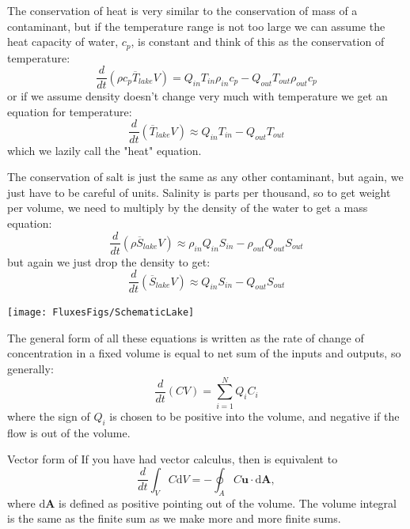 The conservation of heat is very similar to the conservation of mass of a contaminant, but if the temperature range is not too large we can assume the heat capacity of water, $c_p$, is constant and think of this as the conservation of temperature:
\begin{equation}
    \frac{d}{dt}\left(\rho c_p \overline{T}_{lake} V\right) = Q_{in} T_{in}\rho_{in} c_p - Q_{out}T_{out} \rho_{out} c_p
\end{equation}
or if we assume density doesn't change very much with temperature we get an equation for temperature:
\begin{equation}
    \frac{d}{dt}\left(\overline{T}_{lake} V\right) \approx Q_{in} T_{in} - Q_{out}T_{out} 
\end{equation}
which we lazily call the "heat" equation.  

The conservation of salt is just the same as any other contaminant, but again, we just have to be careful of units.  Salinity is parts per thousand, so to get weight per volume, we need to multiply by the density of the water to get a mass equation:
\begin{equation}
    \frac{d}{dt}\left(\rho \overline{S}_{lake} V\right) \approx \rho_{in} Q_{in} S_{in} - \rho_{out}Q_{out}S_{out} 
\end{equation}
but again we just drop the density to get:
\begin{equation}
    \frac{d}{dt}\left(\overline{S}_{lake} V\right) \approx Q_{in} S_{in} - Q_{out}S_{out} 
\end{equation}

\begin{marginfigure}
    \texttt{[image: FluxesFigs/SchematicLake]}
    \caption{Schematic of lake with 5 possible inlets.  If $Q_i<0$ that means the flow is out of the lake.   }
\end{marginfigure}

The general form of all these equations is written as the rate of change of concentration in a fixed volume is equal to net sum of the inputs and outputs, so generally:
\begin{equation}
    \label{eq:sumMassCon}
    \frac{d}{dt}\left(C V\right) = \sum_{i=1}^N Q_{i} C_{i}
\end{equation}
where the sign of $Q_i$ is chosen to be positive into the volume, and negative if the flow is out of the volume.  



\begin{derivbox}[label={box:volumeintegral}]{Vector form of }
    If you have had vector calculus, then  is equivalent to 
    \begin{equation}
        \frac{d}{dt}\int_V C \mathrm{d}V = - \oint_A C \mathbf{u}\cdot \mathrm{d}\mathbf{A},
    \end{equation} 
    where $\mathrm{d}\mathbf{A}$ is defined as positive pointing out of the volume.  The volume integral is the same as the finite sum as we make more and more finite sums.  
\end{derivbox}

